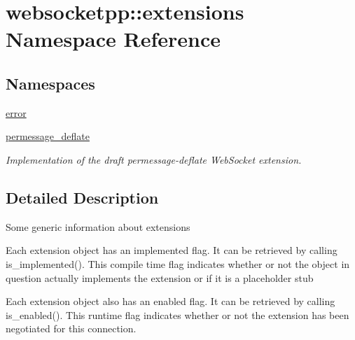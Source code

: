 \hypertarget{namespacewebsocketpp_1_1extensions}{}\section{websocketpp\+:\+:extensions Namespace Reference}
\label{namespacewebsocketpp_1_1extensions}
\subsection*{Namespaces}
\begin{DoxyCompactItemize}
\item 
 \hyperlink{namespacewebsocketpp_1_1extensions_1_1error}{error}
\item 
 \hyperlink{namespacewebsocketpp_1_1extensions_1_1permessage__deflate}{permessage\+\_\+deflate}
\begin{DoxyCompactList}\small\item\em Implementation of the draft permessage-\/deflate Web\+Socket extension. \end{DoxyCompactList}\end{DoxyCompactItemize}


\subsection{Detailed Description}
Some generic information about extensions

Each extension object has an implemented flag. It can be retrieved by calling is\+\_\+implemented(). This compile time flag indicates whether or not the object in question actually implements the extension or if it is a placeholder stub

Each extension object also has an enabled flag. It can be retrieved by calling is\+\_\+enabled(). This runtime flag indicates whether or not the extension has been negotiated for this connection. 
